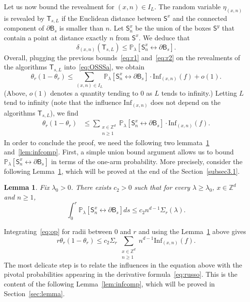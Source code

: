 \documentclass[10pt]{amsart}
\newtheorem{lemm}[theo]{Lemma}\newtheorem{prop}[theo]{Proposition}\newtheorem{coro}[theo]{Corollary}\newtheorem{conj}[theo]{Conjecture}
\theoremstyle{definition}\newtheorem{defi}[theo]{Definition}\newtheorem{rema}[theo]{Remark}\newtheorem{exam}[theo]{Example}\newtheorem{exem}[theo]{Example}\newtheorem{nota}[theo]{Notation}
\newcommand{\infl}{\mathrm{Inf}}
\begin{document}
Let us now bound the revealment for $(x,n)\in I_L$. The random variable $\eta_{(x,n)}$ is revealed by $\mathsf T_{s,L}$ if the Euclidean distance between $\mathsf S^x$ and the connected component of $\partial \mathsf B_s$ is smaller than $n$. Let $\mathsf S^x_n$ be the union of the boxes $\mathsf S^y$ that contain a point at distance exactly $n$ from $\mathsf S^x$. We deduce that
\begin{equation}\label{eq:r2}
\delta_{(x,n)}(\mathsf T_{s,L})\le {\mathbb P}_\lambda[\mathsf S^x_n\stackrel{}{\longleftrightarrow}\partial\mathsf B_s].
\end{equation}
Overall, plugging the previous bounds~\eqref{eq:r1} and~\eqref{eq:r2} on the revealments of the algorithms $\mathsf T_{s,L}$ into~\eqref{eq:OSSSa}, we obtain
\[
\theta_{r}(1-\theta_{r}) \le \sum_{(x,n)\in I_L}{\mathbb P}_\lambda[\mathsf S^x_n\stackrel{}{\longleftrightarrow}\partial\mathsf B_s]\cdot \infl_{(x,n)}(f) +o(1).
\]
(Above, $o(1)$ denotes a quantity tending to $0$ as $L$ tends to infinity.) Letting $L$ tend to infinity (note that the influence $\infl_{(x,n)}$ does not depend on the algorithms $\mathsf T_{s,L}$), we find
\begin{align}\label{eq:op}
\theta_{r}(1-\theta_{r}) &\le \sum_{\substack{x\in {\mathbb Z}^d\\ n\ge1}}{\mathbb P}_\lambda[\mathsf S^x_n\stackrel{}{\longleftrightarrow}\partial\mathsf B_s]\cdot \infl_{(x,n)}(f).
\end{align}
In order to conclude the proof, we need the following two lemmata~\ref{lem:1} and~\ref{lem:infcomp}. First, a simple union bound argument allows us to bound ${\mathbb P}_\lambda[\mathsf S^x_n\stackrel{}{\longleftrightarrow}\partial\mathsf B_s]$ in terms of the one-arm probability. More precisely, consider the following Lemma~\ref{lem:1}, which will be proved at the end of the Section~\ref{subsec3.1}.

\begin{lemm}\label{lem:1}
Fix $\lambda_0>0$. There exists $c_2>0$ such that for every $\lambda\ge\lambda_0$, $x\in{\mathbb Z}^d$ and $n\ge1$,
\[
\int_0^r{\mathbb P}_\lambda[\mathsf S^x_n\stackrel{}{\longleftrightarrow}\partial\mathsf B_s]ds\le c_2 n^{d-1}\Sigma_r(\lambda).
\]
\end{lemm}

Integrating~\eqref{eq:op} for radii between 0 and $r$ and using the Lemma~\ref{lem:1} above gives
\begin{equation}\label{eq:4}
r\theta_{r}(1-\theta_{r}) \le c_2\Sigma_r\ \sum_{\substack{x\in {\mathbb Z}^d\\ n\ge1}} n^{d-1}\infl_{(x,n)}(f).
\end{equation}
The most delicate step is to relate the influences in the equation above with the pivotal probabilities appearing in the derivative formula~\eqref{eq:russo}. This is the content of the following Lemma~\ref{lem:infcomp}, which will be proved in Section~\ref{sec:lemma}.
\end{document}
